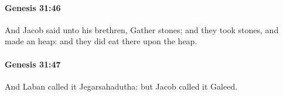 		\paragraph{Genesis 31:46} %
			\label{GENESIS-31-46}

			And Jacob said unto his brethren, Gather stones; and they took stones, and made an heap: and they did eat there upon the heap.


		\paragraph{Genesis 31:47} %
			\label{GENESIS-31-47}

			And Laban called it Jegarsahadutha: but Jacob called it Galeed.


